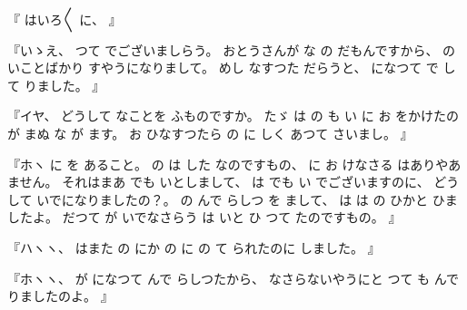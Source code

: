 
%
『
はいろ〳〵
に、
』

%
『いゝえ、
%
つて
でございましらう。
%
おとうさんが
な
の
だもんですから、
%
の
いことばかり
すやうになりまして。
%
めし
なすつた
だらうと、
%
になつて
で
して
りました。
』

%
『イヤ、
%
どうして
なことを
ふものですか。
%
たゞ
は
の
も
い
に
お
をかけたのが
まぬ
な
が
ます。
%
お
ひなすつたら
の
に
しく
あつて
さいまし。
』

%
『ホヽ
に
を
あること。
%
の
は
した
なのですもの、
%
に
お
けなさる
はありやあ
ません。
%
それはまあ
でも
いとしまして、
%
は
でも
い
でございますのに、
%
どうして
いでになりましたの？。
%
の
んで
らしつ
を
まして、
%
は
は
の
ひかと
ひましたよ。
%
だつて
が
いでなさらう
は
いと
ひ
つて
たのですもの。
』

%
『ハヽヽ、
%
はまた
の
にか
の
に
の
て
られたのに
しました。
』

%
『ホヽヽ、
%
が
になつて
んで
らしつたから、
%
なさらないやうにと
つて
も
んで
りましたのよ。
』

